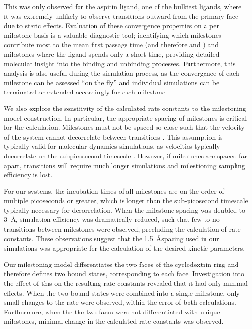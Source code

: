 This was only observed for the aspirin ligand, one of the bulkiest ligands, where it was extremely unlikely to observe transitions outward from the primary face due to steric effects.
Evaluation of these convergence properties on a
per milestone basis is a valuable diagnostic tool; identifying which
milestones contribute most to the mean first passage time (and therefore \kon
and \koff) and milestones where the ligand spends only a short time, providing
detailed molecular insight into the binding and unbinding processes.
Furthermore, this analysis is also useful during the simulation process,
as the convergence of each milestone can be assessed ``on the fly'' and individual simulations
can be terminated or extended accordingly for each milestone.

\par We also explore the sensitivity of the calculated rate constants to the milestoning model construction. In particular, the appropriate
spacing of milestones is critical for the calculation. Milestones must not be
spaced so close such that the velocity of the system cannot decorrelate between
transitions \cite{Vanden-Eijnden2008,West2007}. This assumption is typically
valid for molecular dynamics simulations, as velocities typically decorrelate on
the subpicosecond timescale \cite{Vanden-Eijnden2008}. However, if milestones are
spaced far apart, transitions will require much longer simulations and
milestioning sampling efficiency is lost.

For our systems, the incubation times of all milestones are on the order
of multiple picoseconds or greater, which
is longer than the sub-picosecond timescale typically necessary for decorrelation\cite{Vanden-Eijnden2008}.
When the milestone spacing was doubled to 3~\AA, simulation efficiency was
dramatically reduced, such that few to no transitions between milestones were
observed, precluding the calculation of rate constants. These observations suggest
that the 1.5~\AA spacing used in our simulations was appropriate for the
calculation of the desired kinetic parameters.

\par Our milestoning model differentiates the two faces
of the cyclodextrin ring and therefore defines two bound states, corresponding
to each face. Investigation into the effect of this on the resulting rate
constants revealed that it had only minimal effects. When the two bound states
were combined into a single milestone, only small changes to the rate were
observed, within the error of both calculations. Furthermore, when the the two
faces were not differentiated with unique milestones, minimal change in the
calculated rate constants was observed.

